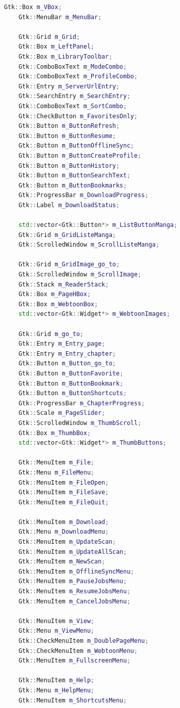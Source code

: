 \documentclass[11pt,a4paper]{article}
\begin{document}
\begin{codebox}
\begin{lstlisting}[language=C++]
    Gtk::Box m_VBox;
    Gtk::MenuBar m_MenuBar;

    Gtk::Grid m_Grid;
    Gtk::Box m_LeftPanel;
    Gtk::Box m_LibraryToolbar;
    Gtk::ComboBoxText m_ModeCombo;
    Gtk::ComboBoxText m_ProfileCombo;
    Gtk::Entry m_ServerUrlEntry;
    Gtk::SearchEntry m_SearchEntry;
    Gtk::ComboBoxText m_SortCombo;
    Gtk::CheckButton m_FavoritesOnly;
    Gtk::Button m_ButtonRefresh;
    Gtk::Button m_ButtonResume;
    Gtk::Button m_ButtonOfflineSync;
    Gtk::Button m_ButtonCreateProfile;
    Gtk::Button m_ButtonHistory;
    Gtk::Button m_ButtonSearchText;
    Gtk::Button m_ButtonBookmarks;
    Gtk::ProgressBar m_DownloadProgress;
    Gtk::Label m_DownloadStatus;

    std::vector<Gtk::Button*> m_ListButtonManga;
    Gtk::Grid m_GridListeManga;
    Gtk::ScrolledWindow m_ScrollListeManga;

    Gtk::Grid m_GridImage_go_to;
    Gtk::ScrolledWindow m_ScrollImage;
    Gtk::Stack m_ReaderStack;
    Gtk::Box m_PageHBox;
    Gtk::Box m_WebtoonBox;
    std::vector<Gtk::Widget*> m_WebtoonImages;

    Gtk::Grid m_go_to;
    Gtk::Entry m_Entry_page;
    Gtk::Entry m_Entry_chapter;
    Gtk::Button m_Button_go_to;
    Gtk::Button m_ButtonFavorite;
    Gtk::Button m_ButtonBookmark;
    Gtk::Button m_ButtonShortcuts;
    Gtk::ProgressBar m_ChapterProgress;
    Gtk::Scale m_PageSlider;
    Gtk::ScrolledWindow m_ThumbScroll;
    Gtk::Box m_ThumbBox;
    std::vector<Gtk::Widget*> m_ThumbButtons;

    Gtk::MenuItem m_File;
    Gtk::Menu m_FileMenu;
    Gtk::MenuItem m_FileOpen;
    Gtk::MenuItem m_FileSave;
    Gtk::MenuItem m_FileQuit;

    Gtk::MenuItem m_Download;
    Gtk::Menu m_DownloadMenu;
    Gtk::MenuItem m_UpdateScan;
    Gtk::MenuItem m_UpdateAllScan;
    Gtk::MenuItem m_NewScan;
    Gtk::MenuItem m_OfflineSyncMenu;
    Gtk::MenuItem m_PauseJobsMenu;
    Gtk::MenuItem m_ResumeJobsMenu;
    Gtk::MenuItem m_CancelJobsMenu;

    Gtk::MenuItem m_View;
    Gtk::Menu m_ViewMenu;
    Gtk::CheckMenuItem m_DoublePageMenu;
    Gtk::CheckMenuItem m_WebtoonMenu;
    Gtk::MenuItem m_FullscreenMenu;

    Gtk::MenuItem m_Help;
    Gtk::Menu m_HelpMenu;
    Gtk::MenuItem m_ShortcutsMenu;


\end{lstlisting}
\end{codebox}
\end{document}
